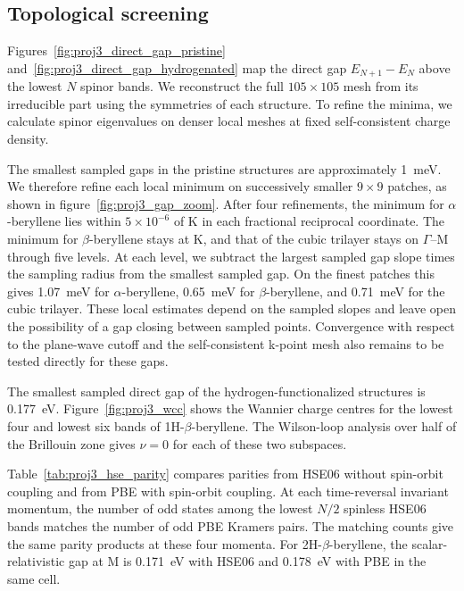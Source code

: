 \FloatBarrier
\subsection*{Topological screening}

Figures~\ref{fig:proj3_direct_gap_pristine} and~\ref{fig:proj3_direct_gap_hydrogenated} map the direct gap $E_{N+1}-E_{N}$ above the lowest $N$ spinor bands.
We reconstruct the full $105 \times 105$ mesh from its irreducible part using the symmetries of each structure.
To refine the minima, we calculate spinor eigenvalues on denser local meshes at fixed self-consistent charge density.

The smallest sampled gaps in the pristine structures are approximately \qty{1}{\milli\electronvolt}.
We therefore refine each local minimum on successively smaller $9 \times 9$ patches, as shown in figure~\ref{fig:proj3_gap_zoom}.
After four refinements, the minimum for $\alpha$-beryllene lies within $5\times10^{-6}$ of $\mathrm{K}$ in each fractional reciprocal coordinate.
The minimum for $\beta$-beryllene stays at $\mathrm{K}$, and that of the cubic trilayer stays on $\Gamma$--$\mathrm{M}$ through five levels.
At each level, we subtract the largest sampled gap slope times the sampling radius from the smallest sampled gap.
On the finest patches this gives \qty{1.07}{\milli\electronvolt} for $\alpha$-beryllene, \qty{0.65}{\milli\electronvolt} for $\beta$-beryllene, and \qty{0.71}{\milli\electronvolt} for the cubic trilayer.
These local estimates depend on the sampled slopes and leave open the possibility of a gap closing between sampled points.
Convergence with respect to the plane-wave cutoff and the self-consistent k-point mesh also remains to be tested directly for these gaps.

The smallest sampled direct gap of the hydrogen-functionalized structures is \qty{0.177}{\electronvolt}.
Figure~\ref{fig:proj3_wcc} shows the Wannier charge centres for the lowest four and lowest six bands of 1H-$\beta$-beryllene.
The Wilson-loop analysis over half of the Brillouin zone gives $\nu=0$ for each of these two subspaces.

Table~\ref{tab:proj3_hse_parity} compares parities from HSE06 without spin-orbit coupling and from PBE with spin-orbit coupling.
At each time-reversal invariant momentum, the number of odd states among the lowest $N/2$ spinless HSE06 bands matches the number of odd PBE Kramers pairs.
The matching counts give the same parity products at these four momenta.
For 2H-$\beta$-beryllene, the scalar-relativistic gap at $\mathrm{M}$ is \qty{0.171}{\electronvolt} with HSE06 and \qty{0.178}{\electronvolt} with PBE in the same cell.

